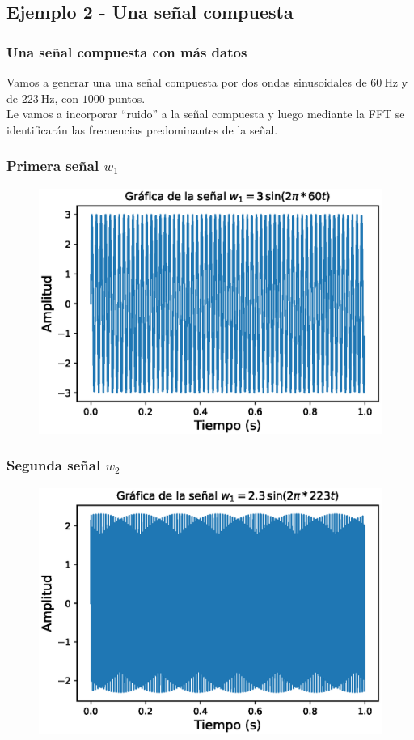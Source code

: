 \documentclass[12pt]{beamer}
\begin{document}
\subsection{Ejemplo 2 - Una señal compuesta}
\begin{frame}
\frametitle{Una señal compuesta con más datos}
Vamos a generar una una señal compuesta por dos ondas sinusoidales de $\SI{60}{\hertz}$ y de $\SI{223}{\hertz}$, con $1000$ puntos.
\\
\bigskip
\pause
Le vamos a incorporar \enquote{ruido} a la señal compuesta y luego mediante la FFT se identificarán las frecuencias predominantes de la señal.
\end{frame}
\begin{frame}
\frametitle{Primera señal $w_{1}$}
\begin{figure}
    \centering
    \includegraphics[scale=0.65]{Imagenes/DFT_Analisis_Senal_01.eps}
\end{figure}
\end{frame}
\begin{frame}
\frametitle{Segunda señal $w_{2}$}
\begin{figure}
    \centering
    \includegraphics[scale=0.65 ]{Imagenes/DFT_Analisis_Senal_02.eps}
\end{figure}
\end{frame}
\end{document}

